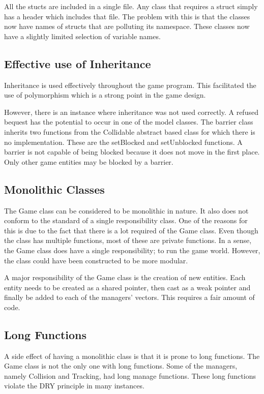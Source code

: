 \documentclass[10pt,twocolumn]{witseiepaper}
\begin{document}
All the stucts are included in a single file. Any class that requires a struct simply has a header which includes that file. The problem with this is that the classes now have names of structs that are polluting its namespace. These classes now have a slightly limited selection of variable names.

\subsection{Effective use of Inheritance}
Inheritance is used effectively throughout the game program. This facilitated the use of polymorphism which is a strong point in the game design.

However, there is an instance where inheritance was not used correctly. A refused bequest has the potential to occur in one of the model classes. The barrier class inherits two functions from the Collidable abstract based class for which there is no implementation. These are the setBlocked and setUnblocked functions. A barrier is not capable of being blocked because it does not move in the first place. Only other game entities may be blocked by a barrier.

\subsection{Monolithic Classes}
The Game class can be considered to be monolithic in nature. It also does not conform to the standard of a single responsibility class. One of the reasons for this is due to the fact that there is a lot required of the Game class. Even though the class has multiple functions, most of these are private functions. In a sense, the Game class does have a single responsibility; to run the game world. However, the class could have been constructed to be more modular.

A major responsibility of the Game class is the creation of new entities. Each entity needs to be created as a shared pointer, then cast as a weak pointer and finally be added to each of the managers' vectors. This requires a fair amount of code. 

\subsection{Long Functions}
A side effect of having a monolithic class is that it is prone to long functions. The Game class is not the only one with long functions. Some of the managers, namely Collision and Tracking, had long manage functions. These long functions violate the DRY principle in many instances.
\end{document}
